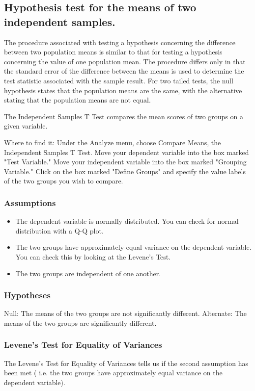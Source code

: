 \documentclass[12pt, a4paper]{report}
\begin{document}
\subsection{Hypothesis test for the means of two independent samples.}
The procedure associated with testing a hypothesis concerning the difference between two population means is similar to that for testing a hypothesis concerning the value of one population mean. The procedure differs only in that the standard error of the difference between the means is used to determine the test statistic associated with the sample result. For two tailed tests, the null hypothesis states that the population means are the same, with the alternative stating that the population means are not equal.


The Independent Samples T Test compares the mean scores of two groups on a given variable.

Where to find it: Under the Analyze menu, choose Compare Means, the Independent Samples T Test. Move your dependent variable into the box marked "Test Variable." Move your independent variable into the box marked "Grouping Variable." Click on the box marked "Define Groups" and specify the value labels of the two groups you wish to compare.

\subsubsection{Assumptions}
\begin{itemize}
\item The dependent variable is normally distributed. You can check for normal distribution with a Q-Q plot.
\item The two groups have approximately equal variance on the dependent variable. You can check this by looking at the Levene's Test.
\item The two groups are independent of one another.
\end{itemize}

\subsubsection{Hypotheses}
Null: The means of the two groups are not significantly different.
Alternate: The means of the two groups are significantly different.

\subsubsection{Levene's Test for Equality of Variances}
The Levene's Test for Equality of Variances  tells us if the second assumption has been met ( i.e. the two groups have approximately equal variance on the dependent variable).
\end{document}
